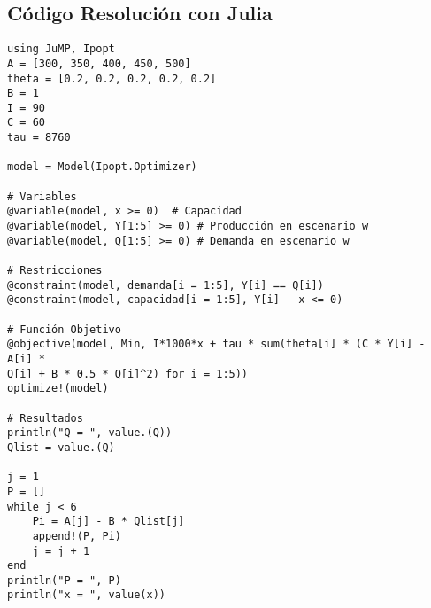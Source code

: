 \subsection{Código Resolución con Julia}\label{codigoJulia}
\begin{footnotesize}
\begin{lstlisting}
using JuMP, Ipopt
A = [300, 350, 400, 450, 500]
theta = [0.2, 0.2, 0.2, 0.2, 0.2]
B = 1
I = 90
C = 60
tau = 8760

model = Model(Ipopt.Optimizer)

# Variables
@variable(model, x >= 0)  # Capacidad
@variable(model, Y[1:5] >= 0) # Producción en escenario w
@variable(model, Q[1:5] >= 0) # Demanda en escenario w

# Restricciones
@constraint(model, demanda[i = 1:5], Y[i] == Q[i])
@constraint(model, capacidad[i = 1:5], Y[i] - x <= 0)

# Función Objetivo
@objective(model, Min, I*1000*x + tau * sum(theta[i] * (C * Y[i] - A[i] * 
Q[i] + B * 0.5 * Q[i]^2) for i = 1:5))
optimize!(model)

# Resultados
println("Q = ", value.(Q))
Qlist = value.(Q)

j = 1
P = []
while j < 6
    Pi = A[j] - B * Qlist[j]
    append!(P, Pi)
    j = j + 1
end
println("P = ", P)
println("x = ", value(x))
\end{lstlisting}
\end{footnotesize}